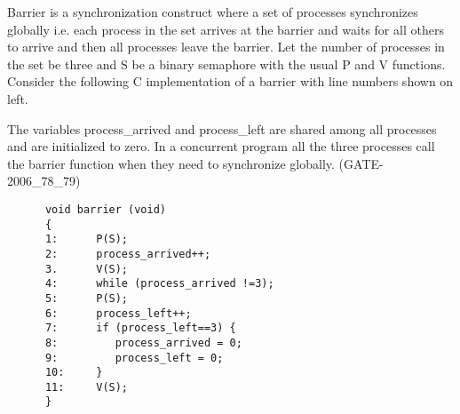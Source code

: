 
\begin{questyle}

    \question  Barrier is a synchronization construct where a set of processes synchronizes globally i.e. each process in the set arrives at the barrier and waits for all others to arrive and then all processes leave the barrier. Let the number of processes in the set be three and S be a binary semaphore with the usual P and V functions. Consider the following C implementation of a barrier with line numbers shown on left.

    The variables process\_arrived and process\_left are shared among all processes and are initialized to zero.
    In a concurrent program all the three processes call the barrier function when they need to synchronize globally. (GATE- 2006\_78\_79)

  \begin{lstlisting}
      void barrier (void)
      {
      1:      P(S);
      2:      process_arrived++;
      3.      V(S);
      4:      while (process_arrived !=3);
      5:      P(S);
      6:      process_left++;
      7:      if (process_left==3) {
      8:	     process_arrived = 0;
      9:	     process_left = 0;
      10:     }
      11:     V(S);
      }
  \end{lstlisting}

\end{questyle}
